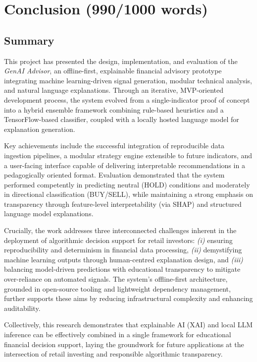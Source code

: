 \section{Conclusion (990/1000 words)}

\subsection{Summary}

This project has presented the design, implementation, and evaluation of the \textit{GenAI Advisor}, an offline-first, explainable financial advisory prototype integrating machine learning-driven signal generation, modular technical analysis, and natural language explanations. Through an iterative, MVP-oriented development process, the system evolved from a single-indicator proof of concept into a hybrid ensemble framework combining rule-based heuristics and a TensorFlow-based classifier, coupled with a locally hosted language model for explanation generation.

Key achievements include the successful integration of reproducible data ingestion pipelines, a modular strategy engine extensible to future indicators, and a user-facing interface capable of delivering interpretable recommendations in a pedagogically oriented format. Evaluation demonstrated that the system performed competently in predicting neutral (HOLD) conditions and moderately in directional classification (BUY/SELL), while maintaining a strong emphasis on transparency through feature-level interpretability (via SHAP) and structured language model explanations.

Crucially, the work addresses three interconnected challenges inherent in the deployment of algorithmic decision support for retail investors: \textit{(i)} ensuring reproducibility and determinism in financial data processing, \textit{(ii)} demystifying machine learning outputs through human-centred explanation design, and \textit{(iii)} balancing model-driven predictions with educational transparency to mitigate over-reliance on automated signals. The system’s offline-first architecture, grounded in open-source tooling and lightweight dependency management, further supports these aims by reducing infrastructural complexity and enhancing auditability.

Collectively, this research demonstrates that explainable AI (XAI) and local LLM inference can be effectively combined in a single framework for educational financial decision support, laying the groundwork for future applications at the intersection of retail investing and responsible algorithmic transparency.

